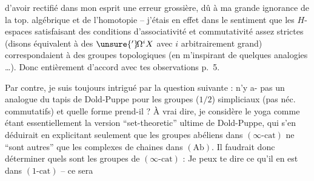 d'avoir rectifié dans mon esprit une erreur grossière, dû à ma grande ignorance de la top. algébrique et de l'homotopie -- j'étais en effet dans le sentiment que les $H$-espaces satisfaisant des conditions d'associativité et commutativité assez strictes (disons équivalent à des $\unsure{{}'}\!\Omega^{i}X$ avec $i$ arbitrairement grand) correspondaient à des groupes topologiques  (en m'inspirant de quelques analogies \dots). Donc entièrement d'accord avec tes observations p.~5.

Par contre, je suis toujours intrigué par la question suivante : n'y a- pas un analogue du tapis de Dold-Puppe pour les groupes ($1/2$) simpliciaux (pas néc. commutatifs) et quelle forme prend-il ? À vrai dire, je considère le yoga
comme étant essentiellement la version ``set-theoretic'' ultime de Dold-Puppe, qui s'en déduirait en explicitant seulement que les groupes abéliens dans $(\infty\text{-cat})$ ne ``sont autres'' que les complexes de chaines dans $(\mathrm{Ab})$. Il faudrait donc déterminer quels sont les groupes de $(\infty\text{-cat})$ : Je peux te dire ce qu'il en est dans $(1\text{-cat})$ -- ce sera %
